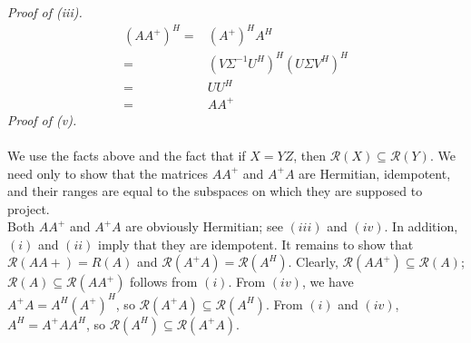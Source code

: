 \documentclass[letterpaper,12pt]{article}
\theoremstyle{definition}
\begin{document}
\emph{Proof of (iii).}
\begin{align*}
  (AA^{+})^H =& (A^{+})^H A^H \\
             =& (V \Sigma^{-1} U^H)^H (U \Sigma V^H)^H \\
             =& U U^H \\
             =& A A^{+}
\end{align*}
\emph{Proof of (v).} \\\\
We use the facts above and the fact that if $X=YZ$, then $ \mathcal{R}(X) \subseteq \mathcal{R}(Y)$. We need only to show that the matrices $AA^{+}$ and $A^{+}A$ are Hermitian, idempotent, and their ranges are equal to the subspaces on which they are supposed to project. \\

Both $AA^{+}$ and $A^{+}A$ are obviously Hermitian; see $(iii)$ and $(iv)$. In addition, $(i)$ and $(ii)$ imply that they are idempotent. It remains to show that $\mathcal{R}(AA+)=R(A)$ and $\mathcal{R}(A^{+}A)=\mathcal{R}(A^H)$. Clearly, $\mathcal{R}(AA^{+}) \subseteq \mathcal{R}(A)$; $\mathcal{R}(A) \subseteq \mathcal{R}(A A^{+})$ follows from $(i)$. From $(iv)$, we have $A^{+}A=A^H (A^{+})^H$, so $\mathcal{R}(A^{+}A) \subseteq \mathcal{R}(A^H)$. From $(i)$ and $(iv)$, $A^H=A^{+}AA^H$, so $\mathcal{R}(A^H) \subseteq \mathcal{R}(A^{+}A)$.
\end{document}
